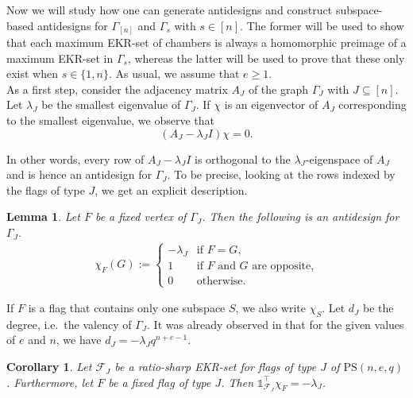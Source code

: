 \documentclass[11pt]{article}
\newtheorem{lemma}[thm]{Lemma}
\newtheorem{cor}[thm]{Corollary}
\newcommand{\allones}{\mathds{1}}
\newcommand{\EKR}{\mathcal{F}}
\newcommand{\PS}{\mathrm{PS}}
\renewcommand{\ge}{\geqslant}
\begin{document}
Now we will study how one can generate antidesigns and construct subspace-based antidesigns for $\Gamma_{[n]}$ and $\Gamma_s$ with $s\in[n]$. The former will be used to show that each maximum EKR-set of chambers is always a homomorphic preimage of a maximum EKR-set in $\Gamma_s$, whereas the latter will be used to prove that these only exist when $s \in \{1,n\}$. As usual, we assume that $e\ge 1$.\\


As a first step, consider the adjacency matrix $A_J$ of the graph $\Gamma_J$ with $J\subseteq [n]$. Let $\lambda_J$ be the smallest eigenvalue of $\Gamma_J$. If $\chi$ is an eigenvector of $A_J$ corresponding to the smallest eigenvalue, we observe that
$$(A_J-\lambda_J I)\chi = 0.$$

In other words, every row of $A_J-\lambda_J I$ is orthogonal to the $\lambda_J$-eigenspace of $A_J$ and is hence an antidesign for $\Gamma_J$. To be precise, looking at the rows indexed by the flags of type $J$, we get an explicit description.

\begin{lemma}
Let $F$ be a fixed vertex of $\Gamma_J$. Then the following is an antidesign for $\Gamma_J$.
\begin{align*}
\chi_F(G):=\begin{cases}
-\lambda_J& \text{if $F=G$,}
\\
1 &  \text{if $F$ and $G$ are opposite,}
\\0 & \text{otherwise.}
\end{cases}
\end{align*}
\end{lemma}

If $F$ is a flag that contains only one subspace $S$, we also write $\chi_S$. Let $d_J$ be the degree, i.e.\ the valency of $\Gamma_J$. It was already observed in \cite[Theorem 3.15]{AlgebraicApproach} that for the given values of $e$ and $n$, we have $d_J=-\lambda_Jq^{n+e-1}$.



\begin{cor} \label{C: intersection basic}
Let $\EKR_J$ be a ratio-sharp EKR-set for flags of type $J$ of $\PS(n,e,q)$. Furthermore, let $F$ be a fixed flag of type $J$. Then $\allones_{\EKR_J}^\top \chi_F=-\lambda_J$.
\end{cor}
\end{document}
